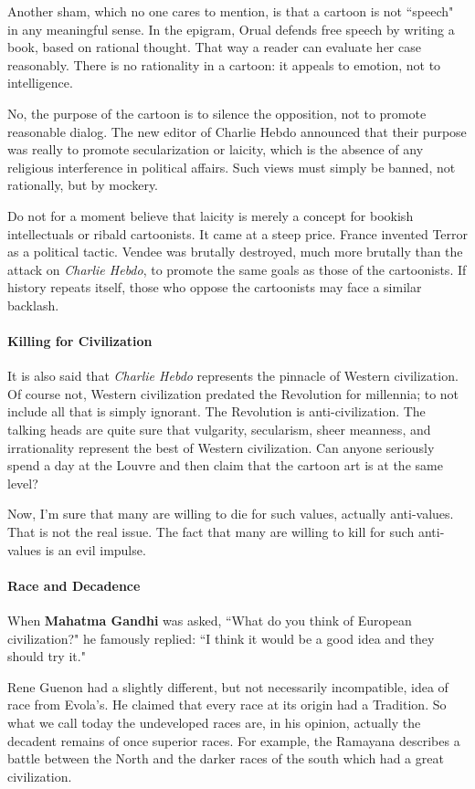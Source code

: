Another sham, which no one cares to mention, is that a cartoon is not ``speech" in any meaningful sense. In the epigram, Orual defends free speech by writing a book, based on rational thought. That way a reader can evaluate her case reasonably. There is no rationality in a cartoon: it appeals to emotion, not to intelligence.

No, the purpose of the cartoon is to silence the opposition, not to promote reasonable dialog. The new editor of Charlie Hebdo announced that their purpose was really to promote secularization or laicity, which is the absence of any religious interference in political affairs. Such views must simply be banned, not rationally, but by mockery.

Do not for a moment believe that laicity is merely a concept for bookish intellectuals or ribald cartoonists. It came at a steep price. France invented Terror as a political tactic. Vendee was brutally destroyed, much more brutally than the attack on \emph{Charlie Hebdo}, to promote the same goals as those of the cartoonists. If history repeats itself, those who oppose the cartoonists may face a similar backlash.

\paragraph{Killing for Civilization}
It is also said that \emph{Charlie Hebdo} represents the pinnacle of Western civilization. Of course not, Western civilization predated the Revolution for millennia; to not include all that is simply ignorant. The Revolution is anti-civilization. The talking heads are quite sure that vulgarity, secularism, sheer meanness, and irrationality represent the best of Western civilization. Can anyone seriously spend a day at the Louvre and then claim that the cartoon art is at the same level?

Now, I'm sure that many are willing to die for such values, actually anti-values. That is not the real issue. The fact that many are willing to kill for such anti-values is an evil impulse.

\paragraph{Race and Decadence}
When \textbf{Mahatma Gandhi} was asked, ``What do you think of European civilization?" he famously replied: ``I think it would be a good idea and they should try it."

Rene Guenon had a slightly different, but not necessarily incompatible, idea of race from Evola's. He claimed that every race at its origin had a Tradition. So what we call today the undeveloped races are, in his opinion, actually the decadent remains of once superior races. For example, the Ramayana describes a battle between the North and the darker races of the south which had a great civilization.

